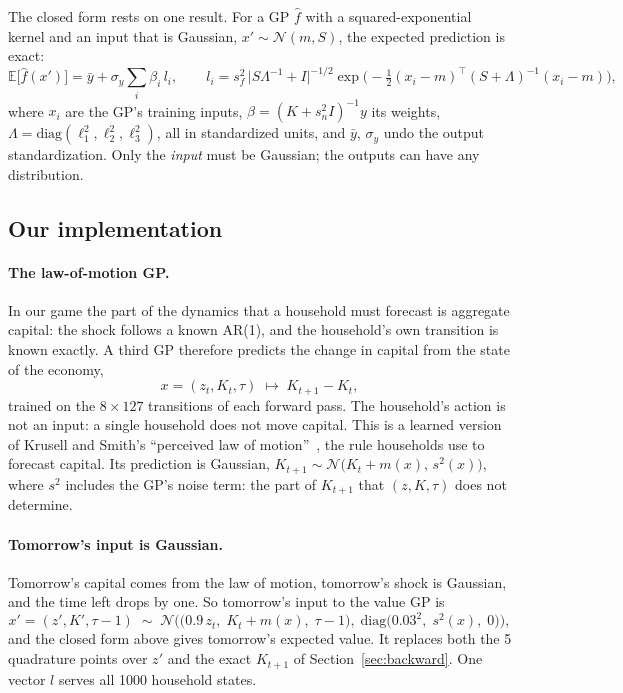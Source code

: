 \documentclass[11pt,a4paper]{article}
\begin{document}
The closed form rests on one result. For a GP $\widehat f$ with a squared-exponential kernel and an
input that is Gaussian, $x' \sim \mathcal N(m, S)$, the expected prediction is exact:
\[
\mathbb E\big[\widehat f(x')\big] = \bar y + \sigma_y \sum_{i} \beta_i\, l_i, \qquad
l_i = s_f^2\, \big|S\Lambda^{-1} + I\big|^{-1/2}
\exp\!\Big(-\tfrac12 (x_i - m)^\top (S + \Lambda)^{-1} (x_i - m)\Big),
\]
where $x_i$ are the GP's training inputs, $\beta = (K + s_n^2 I)^{-1} y$ its weights,
$\Lambda = \mathrm{diag}(\ell_1^2, \ell_2^2, \ell_3^2)$, all in standardized units, and $\bar y$,
$\sigma_y$ undo the output standardization. Only the \emph{input} must be Gaussian; the outputs can
have any distribution.

\subsection{Our implementation}

\paragraph{The law-of-motion GP.} In our game the part of the dynamics that a household must forecast
is aggregate capital: the shock follows a known AR(1), and the household's own transition is known
exactly. A third GP therefore predicts the change in capital from the state of the economy,
\[
x = (z_t, K_t, \tau) \;\longmapsto\; K_{t+1} - K_t ,
\]
trained on the $8 \times 127$ transitions of each forward pass. The household's action is not an
input: a single household does not move capital. This is a learned version of Krusell and Smith's
``perceived law of motion''~\cite{ks}, the rule households use to forecast capital. Its prediction
is Gaussian, $K_{t+1} \sim \mathcal N\big(K_t + m(x),\, s^2(x)\big)$, where $s^2$ includes the GP's
noise term: the part of $K_{t+1}$ that $(z, K, \tau)$ does not determine.

\paragraph{Tomorrow's input is Gaussian.} Tomorrow's capital comes from the law of motion,
tomorrow's shock is Gaussian, and the time left drops by one. So tomorrow's input to the value GP is
\[
x' = (z', K', \tau - 1) \;\sim\; \mathcal N\Big(\big(0.9\,z_t,\; K_t + m(x),\; \tau - 1\big),\;
\mathrm{diag}\big(0.03^2,\; s^2(x),\; 0\big)\Big),
\]
and the closed form above gives tomorrow's expected value. It replaces both the 5 quadrature points
over $z'$ and the exact $K_{t+1}$ of Section~\ref{sec:backward}. One vector $l$ serves all 1000
household states.
\end{document}
